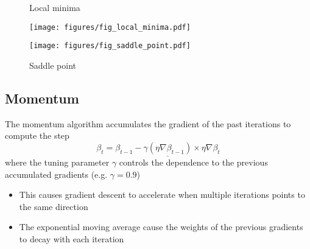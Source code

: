 \documentclass[c]{beamer}
\begin{document}
\begin{frame}{\secname}
	\begin{figure}
		\begin{minipage}{.49\textwidth}
			\caption{Local minima}
			\texttt{[image: figures/fig\_local\_minima.pdf]}
		\end{minipage}
		\hfill
		\begin{minipage}{.49\textwidth}
			\caption{Saddle point}
			\texttt{[image: figures/fig\_saddle\_point.pdf]}
		\end{minipage}
	\end{figure}
\end{frame}

\subsection{Momentum}

\begin{frame}{\secsubname}
	The momentum algorithm \parencite{Qian1999} accumulates the gradient of the past iterations to compute the step
	\begin{equation*}
		\beta_t = \beta_{t-1} - \underline{\gamma \left(\eta \nabla \beta_{t-1}\right)} \times \eta \nabla \beta_{t}
	\end{equation*}
	where the tuning parameter $\gamma$ controls the dependence to the previous accumulated gradients (e.g. $\gamma=0.9$)
	\begin{itemize}
		\item This causes gradient descent to accelerate when multiple iterations points to the same direction
		\item The exponential moving average cause the weights of the previous gradients to decay with each iteration
	\end{itemize}
\end{frame}
\end{document}
